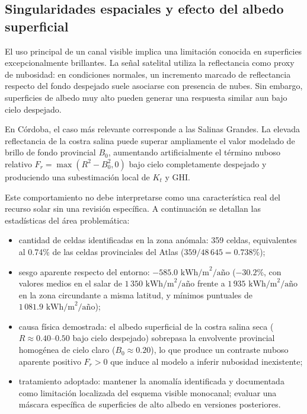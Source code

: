 \documentclass[11pt,a4paper]{article}
\begin{document}
\subsection{Singularidades espaciales y efecto del albedo superficial}

El uso principal de un canal visible implica una limitación conocida en superficies excepcionalmente brillantes. La señal satelital utiliza la reflectancia como proxy de nubosidad: en condiciones normales, un incremento marcado de reflectancia respecto del fondo despejado suele asociarse con presencia de nubes. Sin embargo, superficies de albedo muy alto pueden generar una respuesta similar aun bajo cielo despejado.

En Córdoba, el caso más relevante corresponde a las Salinas Grandes. La elevada reflectancia de la costra salina puede superar ampliamente el valor modelado de brillo de fondo provincial $B_0$, aumentando artificialmente el término nuboso relativo $F_r = \max(R^2 - B_0^2, 0)$ bajo cielo completamente despejado y produciendo una subestimación local de $K_t$ y GHI.

Este comportamiento no debe interpretarse como una característica real del recurso solar sin una revisión específica. A continuación se detallan las estadísticas del área problemática:

\begin{itemize}
    \item cantidad de celdas identificadas en la zona anómala: 359 celdas, equivalentes al 0.74\% de las celdas provinciales del Atlas ($359 / 48\,645 = 0.738\%$);
    \item sesgo aparente respecto del entorno: $-585.0\text{ kWh/m}^2/\text{año}$ ($-30.2\%$, con valores medios en el salar de $1\,350\text{ kWh/m}^2/\text{año}$ frente a $1\,935\text{ kWh/m}^2/\text{año}$ en la zona circundante a misma latitud, y mínimos puntuales de $1\,081.9\text{ kWh/m}^2/\text{año}$);
    \item causa física demostrada: el albedo superficial de la costra salina seca ($R \approx 0.40$--$0.50$ bajo cielo despejado) sobrepasa la envolvente provincial homogénea de cielo claro ($B_0 \approx 0.20$), lo que produce un contraste nuboso aparente positivo $F_r > 0$ que induce al modelo a inferir nubosidad inexistente;
    \item tratamiento adoptado: mantener la anomalía identificada y documentada como limitación localizada del esquema visible monocanal; evaluar una máscara específica de superficies de alto albedo en versiones posteriores.
\end{itemize}
\end{document}
